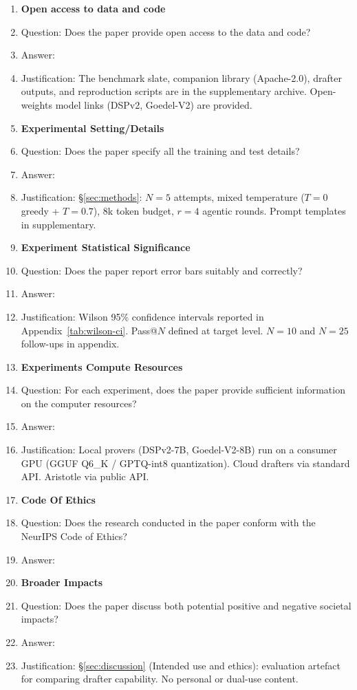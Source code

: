 \begin{enumerate}
\item {\bf Open access to data and code}
    \item[] Question: Does the paper provide open access to the data and code?
    \item[] Answer: \answerYes{}
    \item[] Justification: The benchmark slate, companion library (Apache-2.0), drafter outputs, and reproduction scripts are in the supplementary archive. Open-weights model links (DSPv2, Goedel-V2) are provided.

\item {\bf Experimental Setting/Details}
    \item[] Question: Does the paper specify all the training and test details?
    \item[] Answer: \answerYes{}
    \item[] Justification: \S\ref{sec:methods}: $N=5$ attempts, mixed temperature ($T=0$ greedy + $T=0.7$), 8k token budget, $r=4$ agentic rounds. Prompt templates in supplementary.

\item {\bf Experiment Statistical Significance}
    \item[] Question: Does the paper report error bars suitably and correctly?
    \item[] Answer: \answerYes{}
    \item[] Justification: Wilson 95\% confidence intervals reported in Appendix~\ref{tab:wilson-ci}. Pass@$N$ defined at target level. $N=10$ and $N=25$ follow-ups in appendix.

\item {\bf Experiments Compute Resources}
    \item[] Question: For each experiment, does the paper provide sufficient information on the computer resources?
    \item[] Answer: \answerYes{}
    \item[] Justification: Local provers (DSPv2-7B, Goedel-V2-8B) run on a consumer GPU (GGUF Q6\_K / GPTQ-int8 quantization). Cloud drafters via standard API. Aristotle via public API.

\item {\bf Code Of Ethics}
    \item[] Question: Does the research conducted in the paper conform with the NeurIPS Code of Ethics?
    \item[] Answer: \answerYes{}

\item {\bf Broader Impacts}
    \item[] Question: Does the paper discuss both potential positive and negative societal impacts?
    \item[] Answer: \answerYes{}
    \item[] Justification: \S\ref{sec:discussion} (Intended use and ethics): evaluation artefact for comparing drafter capability. No personal or dual-use content.


\end{enumerate}
